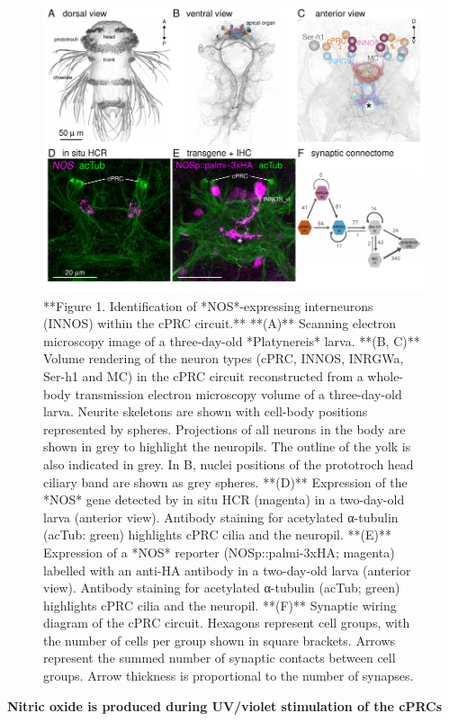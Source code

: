 \documentclass[
  10pt,
  onecolumn]{article}
\begin{document}
\begin{figure}
\includegraphics[width=25in]{figures/Fig1} \caption{**Figure 1. Identification of *NOS*-expressing interneurons (INNOS) within the cPRC circuit.** **(A)** Scanning electron microscopy image of a three-day-old *Platynereis* larva. **(B, C)** Volume rendering of the neuron types (cPRC, INNOS, INRGWa, Ser-h1 and MC) in the cPRC circuit reconstructed from a whole-body transmission electron microscopy volume of a three-day-old larva. Neurite skeletons are shown with cell-body positions represented by spheres. Projections of all neurons in the body are shown in grey to highlight the neuropils. The outline of the yolk is also indicated in grey. In B, nuclei positions of the prototroch head ciliary band are shown as grey spheres. **(D)** Expression of the *NOS* gene detected by in situ HCR (magenta) in a two-day-old larva (anterior view). Antibody staining for acetylated α-tubulin (acTub: green) highlights cPRC cilia and the neuropil. **(E)** Expression of a *NOS* reporter (NOSp::palmi-3xHA; magenta) labelled with an anti-HA antibody in a two-day-old larva (anterior view). Antibody staining for acetylated α-tubulin (acTub; green) highlights cPRC cilia and the neuropil. **(F)** Synaptic wiring diagram of the cPRC circuit. Hexagons represent cell groups, with the number of cells per group shown in square brackets. Arrows represent the summed number of synaptic contacts between cell groups. Arrow thickness is proportional to the number of synapses.}\label{fig:unnamed-chunk-1}
\end{figure}

\textbf{Nitric oxide is produced during UV/violet stimulation of the
cPRCs}
\end{document}
